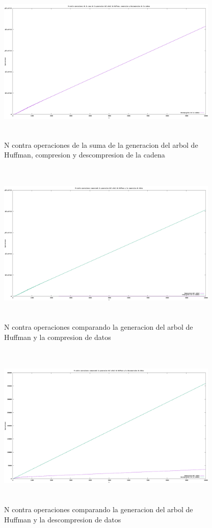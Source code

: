 \documentclass[spanish]{article}
\begin{document}
	\begin{figure}[H]
		\centering
		\includegraphics[width=400px,height=300px]{grafica6}
		\caption{N contra operaciones de la suma de la generacion del arbol de Huffman, compresion y descompresion de la cadena}
	\end{figure}
	\begin{figure}[H]
		\centering
		\includegraphics[width=400px,height=300px]{grafica7}
		\caption{N contra operaciones comparando la generacion del arbol de Huffman y la compresion de datos}
	\end{figure}
	\begin{figure}[H]
		\centering
		\includegraphics[width=400px,height=300px]{grafica8}
		\caption{N contra operaciones comparando la generacion del arbol de Huffman y la descompresion de datos}
	\end{figure}
\end{document}
